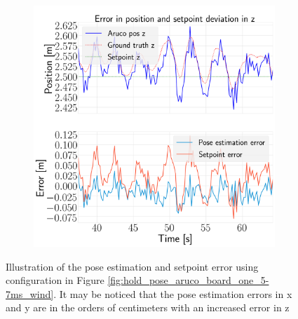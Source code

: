 \documentclass[../Head/report.tex]{subfiles}
\begin{document}
\begin{figure}[H]
\begin{subfigure}[t]{.30\textwidth}
        \caption{}
        \label{fig:hold_pose_estimation_test2_y}
    \end{subfigure}
     \hspace{0.2em}
    \begin{subfigure}[t]{.30\textwidth}
        \centering
        \includegraphics[width=\textwidth]{../Figures/hold_pose_using_aruco_pose_estimation/pose_error_z_test2.png}
        \caption{}
        \label{fig:hold_pose_estimation_test2_z}
    \end{subfigure}
    \caption{Illustration of the pose estimation and setpoint error using configuration in Figure \ref{fig:hold_pose_aruco_board_one_5-7ms_wind}. It may be noticed that the pose estimation errors in x and y are in the orders of centimeters with an increased error in z}
    \label{fig:hold_pose_estimation_test2_error_pos}
\end{figure}
\end{document}
